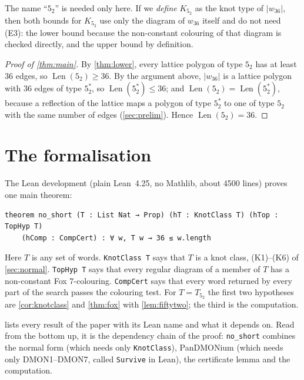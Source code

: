 \documentclass[11pt]{article}
\theoremstyle{plain}
\theoremstyle{definition}
\theoremstyle{remark}
\newcommand{\Len}{\operatorname{Len}}
\newcommand{\lean}[1]{\texttt{#1}}
\newcommand{\Kft}{K_{5_2}}
\newcommand{\dmon}[1]{\textup{DMON#1}}
\begin{document}
The name ``$5_2$'' is needed only here. If we \emph{define} $\Kft$ as the knot type of $|w_{36}|$, then
both bounds for $\Kft$ use only the diagram of $w_{36}$ itself and do not need (E3): the lower bound
because the non-constant colouring of that diagram is checked directly, and the upper bound by
definition.

\begin{proof}[Proof of \cref{thm:main}]
By \cref{thm:lower}, every lattice polygon of type $5_2$ has at least $36$ edges, so
$\Len(5_2)\ge36$. By the argument above, $|w_{36}|$ is a lattice polygon with $36$ edges of type
$5_2^*$, so $\Len(5_2^*)\le36$; and $\Len(5_2)=\Len(5_2^*)$, because a reflection of the lattice maps a
polygon of type $5_2^*$ to one of type $5_2$ with the same number of edges (\cref{sec:prelim}). Hence
$\Len(5_2)=36$.
\end{proof}

\section{The formalisation}\label{sec:lean}

The Lean development (plain Lean~4.25, no Mathlib, about \num{4500} lines) proves one main theorem:
\begin{lstlisting}
theorem no_short (T : List Nat → Prop) (hT : KnotClass T) (hTop : TopHyp T)
    (hComp : CompCert) : ∀ w, T w → 36 ≤ w.length
\end{lstlisting}
Here $T$ is any set of words. \lean{KnotClass T} says that $T$ is a knot class, (K1)--(K6) of
\cref{sec:normal}. \lean{TopHyp T} says that every regular diagram of a member
of $T$ has a non-constant Fox $7$-colouring. \lean{CompCert} says that every word returned by every
part of the search passes the colouring test. For $T=T_{5_2}$ the first two hypotheses are
\cref{cor:knotclass} and \cref{thm:fox} with \cref{lem:fiftytwo}; the third is the computation.

 lists every result of the paper with its Lean name and what it depends on. Read from
the bottom up, it is the dependency chain of the proof: \lean{no\_short} combines the normal form
(which needs only \lean{KnotClass}), PanDMONium (which needs only \dmon1--\dmon7, called
\lean{Survive} in Lean), the certificate lemma and the computation.
\end{document}
